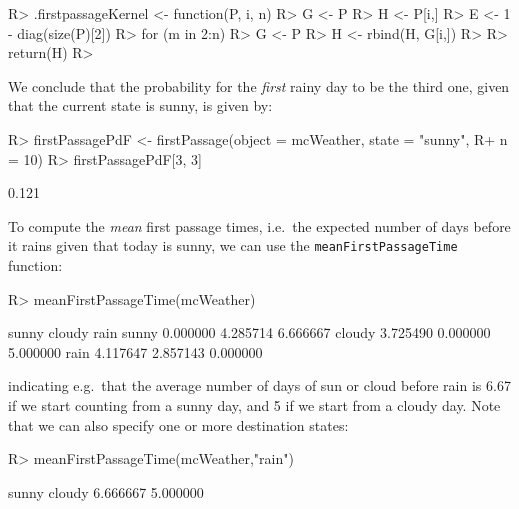 \documentclass[
  nojss]{jss}
\begin{document}
\begin{CodeChunk}

\begin{CodeInput}
R> .firstpassageKernel <- function(P, i, n){
R>   G <- P
R>   H <- P[i,]
R>   E <- 1 - diag(size(P)[2])
R>   for (m in 2:n) {
R>     G <- P %
R>     H <- rbind(H, G[i,])
R>   }
R>   return(H)
R> }
\end{CodeInput}
\end{CodeChunk}

We conclude that the probability for the \emph{first} rainy day to be the third one, given that the current state is sunny, is given by:

\begin{CodeChunk}

\begin{CodeInput}
R> firstPassagePdF <- firstPassage(object = mcWeather, state = "sunny", 
R+                                 n = 10)
R> firstPassagePdF[3, 3]
\end{CodeInput}

\begin{CodeOutput}
[1] 0.121
\end{CodeOutput}
\end{CodeChunk}

To compute the \emph{mean} first passage times, i.e.~the expected number of days before it rains
given that today is sunny, we can use the \texttt{meanFirstPassageTime} function:

\begin{CodeChunk}

\begin{CodeInput}
R> meanFirstPassageTime(mcWeather)
\end{CodeInput}

\begin{CodeOutput}
          sunny   cloudy     rain
sunny  0.000000 4.285714 6.666667
cloudy 3.725490 0.000000 5.000000
rain   4.117647 2.857143 0.000000
\end{CodeOutput}
\end{CodeChunk}

indicating e.g.~that the average number of days of sun or cloud before rain is 6.67 if we start
counting from a sunny day, and 5 if we start from a cloudy day. Note that
we can also specify one or more destination states:

\begin{CodeChunk}

\begin{CodeInput}
R> meanFirstPassageTime(mcWeather,"rain")
\end{CodeInput}

\begin{CodeOutput}
   sunny   cloudy 
6.666667 5.000000 
\end{CodeOutput}
\end{CodeChunk}
\end{document}
